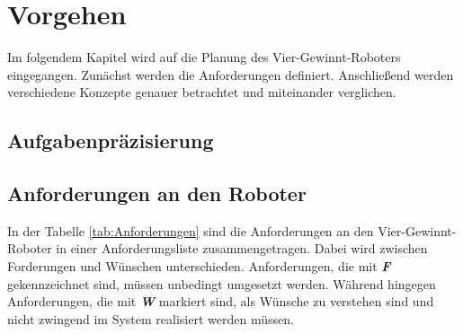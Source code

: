 \chapter{Vorgehen}
Im folgendem Kapitel wird auf die Planung des Vier-Gewinnt-Roboters eingegangen. Zunächst werden die Anforderungen definiert. Anschließend werden verschiedene Konzepte genauer betrachtet und miteinander verglichen.

\section{Aufgabenpräzisierung}


\section{Anforderungen an den Roboter}
In der Tabelle \ref{tab:Anforderungen} sind die Anforderungen an den Vier-Gewinnt-Roboter in einer Anforderungsliste zusammengetragen. Dabei wird zwischen Forderungen und Wünschen unterschieden. Anforderungen, die mit \textsl{\textbf{F}} gekennzeichnet sind, müssen unbedingt umgesetzt werden. Während hingegen Anforderungen, die mit \textsl{\textbf{W}} markiert sind, als Wünsche zu verstehen sind und nicht zwingend im System realisiert werden müssen.

